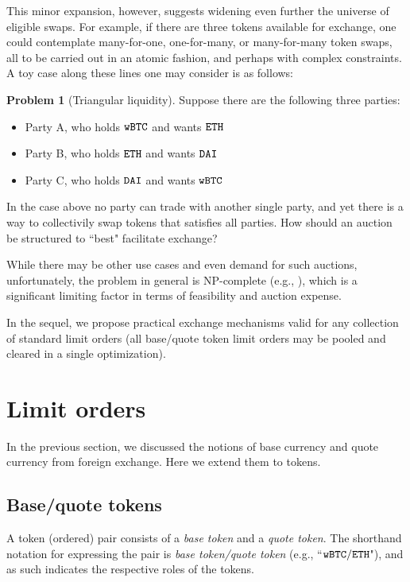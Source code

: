 \documentclass[11pt, reqno]{amsart}
\theoremstyle{definition}
\newtheorem{problem}{Problem}[subsection]
\theoremstyle{remark}
\newcommand{\BTC}{\textnormal{\texttt{wBTC}}}
\newcommand{\ETH}{\textnormal{\texttt{ETH}}}
\newcommand{\DAI}{\textnormal{\texttt{DAI}}}
\begin{document}
This minor expansion, however, suggests widening even further the universe of
eligible swaps. For example, if there are three tokens available for exchange,
one could contemplate many-for-one, one-for-many, or many-for-many token swaps,
all to be carried out in an atomic fashion, and perhaps with complex
constraints. A toy case along these lines one may consider is as follows:

\begin{problem}[Triangular liquidity]
Suppose there are the following three parties:
\begin{itemize}
	\item Party A, who holds $\BTC$ and wants $\ETH$
	\item Party B, who holds $\ETH$ and wants $\DAI$
	\item Party C, who holds $\DAI$ and wants $\BTC$
\end{itemize}

In the case above no party can trade with another single party, and yet there
is a way to collectivily swap tokens that satisfies all parties.
How should an auction be structured to ``best" facilitate exchange?
\end{problem}
While there may be other use cases and even demand for such auctions,
unfortunately, the problem in general is NP-complete (e.g., \cite{XiStWh05}),
which is a significant limiting factor in terms of feasibility and
auction expense.

In the sequel, we propose practical exchange mechanisms valid for any collection
of standard limit orders (all base/quote token limit orders may be pooled and
cleared in a single optimization).

\section{Limit orders}
In the previous section, we discussed the notions of base currency and
quote currency from foreign exchange. Here we extend them to tokens.

\subsection{Base/quote tokens}
A token (ordered) pair consists of a \emph{base token} and a
\emph{quote token}. The shorthand notation for expressing the pair is
\emph{base token/quote token} (e.g., ``$\BTC/\ETH$"), and as such indicates the
respective roles of the tokens.
\end{document}
